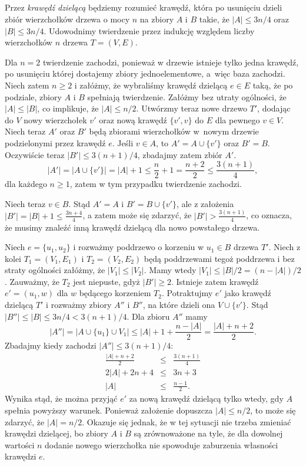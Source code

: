 \subsection{} %

\subsubsection{} %
Przez \emph{krawędź dzielącą} będziemy rozumieć krawędź, która po usunięciu dzieli zbiór wierzchołków drzewa o mocy $n$ na zbiory $A$ i $B$ takie, że $|A|\le3n/4$ oraz $|B|\le3n/4$. Udowodnimy twierdzenie przez indukcję względem liczby wierzchołków $n$ drzewa $T=(V,E)$.

Dla $n=2$ twierdzenie zachodzi, ponieważ w drzewie istnieje tylko jedna krawędź, po usunięciu której dostajemy zbiory jednoelementowe, a~więc baza zachodzi. Niech zatem $n\ge2$ i załóżmy, że wybraliśmy krawędź dzielącą $e\in E$ taką, że po podziale, zbiory $A$ i $B$ spełniają twierdzenie. Załóżmy bez utraty ogólności, że $|A|\le|B|$, co implikuje, że $|A|\le n/2$. Utwórzmy teraz nowe drzewo $T'$, dodając do $V$ nowy wierzchołek $v'$ oraz nową krawędź $\{v',v\}$ do $E$ dla pewnego $v\in V$. Niech teraz $A'$ oraz $B'$ będą zbiorami wierzchołków w~nowym drzewie podzielonymi przez krawędź $e$. Jeśli $v\in A$, to $A'=A\cup\{v'\}$ oraz $B'=B$. Oczywiście teraz $|B'|\le3(n+1)/4$, zbadajmy zatem zbiór $A'$.
\[
	|A'| = \bigl|A\cup\{v'\}\bigr| = |A|+1 \le \frac{n}{2}+1 = \frac{n+2}{2} \le \frac{3(n+1)}{4},
\]
dla każdego $n\ge1$, zatem w tym przypadku twierdzenie zachodzi.

Niech teraz $v\in B$. Stąd $A'=A$ i $B'=B\cup \{v'\}$, ale z założenia $|B'|=|B|+1\le\frac{3n+4}{4}$, a zatem może się zdarzyć, że $|B'|>\frac{3(n+1)}{4}$, co oznacza, że musimy znaleźć inną krawędź dzielącą dla nowo powstałego drzewa.

Niech $e=\{u_1,u_2\}$ i rozważmy poddrzewo o korzeniu w $u_1\in B$ drzewa $T'$. Niech z kolei $T_1=(V_1,E_1)$ i $T_2=(V_2,E_2)$ będą poddrzewami tegoż poddrzewa i bez straty ogólności załóżmy, że $|V_1|\le|V_2|$. Mamy wtedy $|V_1|\le|B|/2=(n-|A|)/2$. Zauważmy, że $T_2$ jest niepuste, gdyż $|B'|\ge2$. Istnieje zatem krawędź $e'=(u_1,w)$ dla $w$ będącego korzeniem $T_2$. Potraktujmy $e'$ jako krawędź dzielącą $T'$ i rozważmy zbiory $A''$ i $B''$, na które dzieli ona $V\cup\{v'\}$. Stąd $|B''|\le|B|\le3n/4<3(n+1)/4$. Dla zbioru $A''$ mamy
\[
	|A''| = \bigl|A\cup\{u_1\}\cup V_1\bigr| \le |A|+1+\frac{n-|A|}{2} = \frac{|A|+n+2}{2}.
\]
Zbadajmy kiedy zachodzi $|A''|\le3(n+1)/4$:
\begin{eqnarray*}
	\frac{|A|+n+2}{2} &\le& \frac{3(n+1)}{4} \\
	2|A|+2n+4 &\le& 3n+3 \\
	|A| &\le& \frac{n-1}{2}.
\end{eqnarray*}
Wynika stąd, że można przyjąć $e'$ za nową krawędź dzielącą tylko wtedy, gdy $A$ spełnia powyższy warunek. Ponieważ założenie dopuszcza $|A|\le n/2$, to może się zdarzyć, że $|A|=n/2$. Okazuje się jednak, że w tej sytuacji nie trzeba zmieniać krawędzi dzielącej, bo zbiory $A$ i $B$ są zrównoważone na tyle, że dla dowolnej wartości $n$ dodanie nowego wierzchołka nie spowoduje zaburzenia własności krawędzi $e$.

